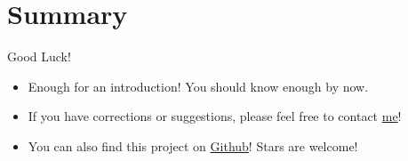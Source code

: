 \section{Summary}

\begin{frame}{Good Luck!}
	\begin{itemize}
		\item Enough for an introduction! You should know enough by now.
		\item If you have corrections or suggestions, please feel free to contact \href{mailto:shiyi.liu@connect.ust.hk}{me}!
        \item You can also find this project on \href{https://github.com/andy-shiyi-liu/HKUST-Beamer-Template}{Github}! Stars are welcome!
	\end{itemize}
\end{frame}